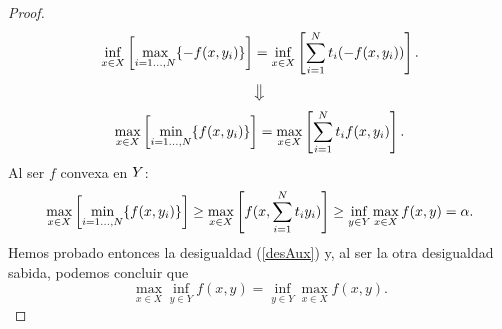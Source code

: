 \begin{proof}
\[
\inf_{x \in X}\left[ \max_{i=1\dots,N } \{-f(x,y_i)\}\right] = \inf_{x \in X} \left[ \sum_{i=1}^{N} t_i (-f(x,y_i)) \right]. 
\] 
\[
\big\Downarrow
\]
\[
\max_{x \in X}\left[ \min_{i=1\dots,N } \{f(x,y_i)\}\right] = \max_{x \in X} \left[ \sum_{i=1}^{N} t_i f(x,y_i) \right]. 
\] 
Al ser $ f $ convexa en $ Y $:
\[
\max_{x \in X}\left[ \min_{i=1\dots,N } \{f(x,y_i)\}\right] \geq \max_{x \in X} \left[ f(x,\sum_{i=1}^{N} t_i y_i) \right] \geq \inf_{y \in Y} \max_{x \in X} f(x,y)= \alpha.
\]
Hemos probado entonces la desigualdad (\ref{desAux}) y, al ser la otra desigualdad sabida, podemos concluir que
\[
\max_{x \in X} \inf_{y \in Y} f(x,y) = \inf_{y \in Y} \max_{x \in X} f(x,y).
\]
\end{proof}
